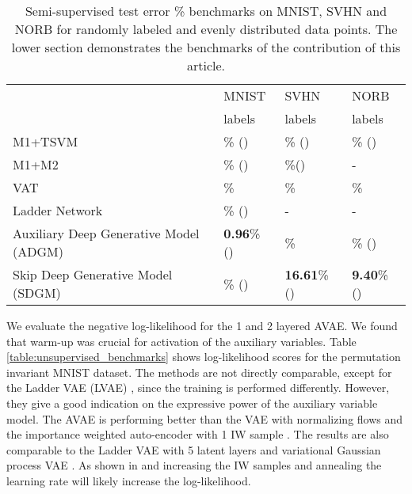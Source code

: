 \documentclass{article}
\begin{document}
\begin{table*}
\begin{center}
\begin{small}
\begin{sc}
\begin{tabular}{l|lll}
\hline
\abovespace\
  & MNIST   & SVHN & NORB \\   
  &  labels &  labels &  labels \\
\hline
\abovespace 
M1+TSVM \citep{Kingma14}& \% () & \% () & \% ()  \\ 
M1+M2 \citep{Kingma14} & \% () &\%() & - \\
VAT \citep{Miyato15} & \% & \% & \% \\
Ladder Network \citep{Rasmus15}& \% () & - & - \\ 
 \hline
 \abovespace 
 Auxiliary Deep Generative Model (ADGM) & \textbf{0.96}\% () & \% & \% () \\
 Skip Deep Generative Model (SDGM) & \% () & \textbf{16.61}\% () & \textbf{9.40}\% () \\
\hline
\end{tabular}\end{sc}
\end{small}
\end{center}
\vskip -0.1in
\caption{Semi-supervised test error \% benchmarks on MNIST, SVHN and NORB for randomly labeled and evenly distributed data points. The lower section demonstrates the benchmarks of the contribution of this article.}\label{table:benchmarks}
\vspace{-2mm}
\end{table*}

We evaluate the negative log-likelihood for the 1 and 2 layered AVAE. We found that warm-up was crucial for activation of the auxiliary variables. Table \ref{table:unsupervised_benchmarks} shows log-likelihood scores for the permutation invariant MNIST dataset. The methods are not directly comparable, except for the Ladder VAE (LVAE) \citep{Sonderby2016}, since the training is performed differently. However, they give a good indication on the expressive power of the auxiliary variable model. The AVAE is performing better than the VAE with normalizing flows \citep{Rezende2015} and the importance weighted auto-encoder with 1 IW sample \citep{Burda15}. The results are also comparable to the Ladder VAE with 5 latent layers \citep{Sonderby2016} and variational Gaussian process VAE \citep{Tran2015}. As shown in \citet{Burda15} and \citet{Sonderby2016} increasing the IW samples and annealing the learning rate will likely increase the log-likelihood.
\end{document}
